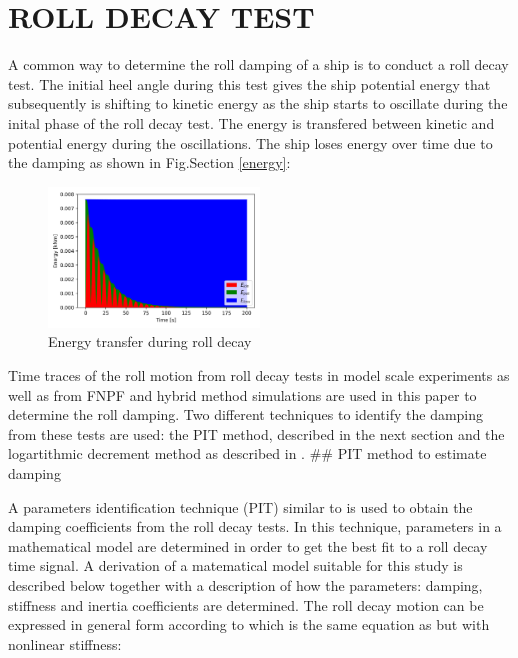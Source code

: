 \section*{ROLL DECAY TEST}\label{roll-decay-test}

    A common way to determine the roll damping of a ship is to conduct a
roll decay test. The initial heel angle during this test gives the ship
potential energy that subsequently is shifting to kinetic energy as the
ship starts to oscillate during the inital phase of the roll decay test.
The energy is transfered between kinetic and potential energy during the
oscillations. The ship loses energy over time due to the damping as
shown in Fig.Section \ref{energy}:
 
            
    
    \begin{figure}[H]
        \begin{center}\includegraphics[width = 0.5\textwidth]{figures/energy.png}\end{center}
        \vspace{-1cm}
        \caption{Energy transfer during roll decay}
        \label{fig:energy}
    \end{figure}
    

    Time traces of the roll motion from roll decay tests in model scale
experiments as well as from FNPF and hybrid method simulations are used
in this paper to determine the roll damping. Two different techniques to
identify the damping from these tests are used: the PIT method,
described in the next section and the logartithmic decrement method as
described in \citep{7505983/BYNJ8CFG}.
     \#\# PIT method to estimate damping \label{se:PIT_method}

    A parameters identification technique (PIT) similar to
\citep{7505983/EXYJELCU} is used to obtain the damping coefficients from
the roll decay tests. In this technique, parameters in a mathematical
model are determined in order to get the best fit to a roll decay time
signal. A derivation of a matematical model suitable for this study is
described below together with a description of how the parameters:
damping, stiffness and inertia coefficients are determined. The roll
decay motion can be expressed in general form according to
\citep{7505983/KL7A3RIV} which is the same equation as
\citep{7505983/FB64RGPF} but with nonlinear stiffness:
 
